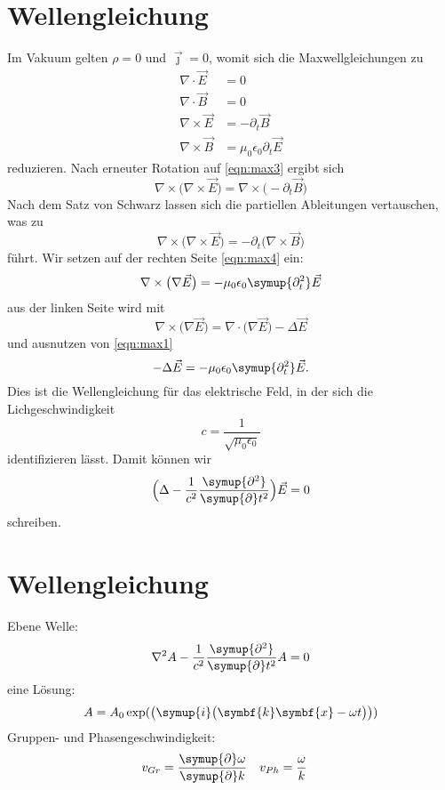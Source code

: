 \documentclass{scrartcl}
\newcommand{\be}{\begin{equation}} %
\newcommand{\ee}{\end{equation}} %
\begin{document}
\section{Wellengleichung}
Im Vakuum gelten $\rho=0$ und $\vec{\jmath}=0$,
womit sich die Maxwellgleichungen
zu
\begin{align}
  \nabla\cdot\vec{E}&=0 \label{eqn:max1} \\
  \nabla\cdot\vec{B}&=0 \label{eqn:max2} \\
  \nabla\times\vec{E}&=-\partial_t\vec{B} \label{eqn:max3} \\
  \nabla\times\vec{B}&=\mu_0\epsilon_0\partial_t\vec{E} \label{eqn:max4}
\end{align}
reduzieren. Nach erneuter Rotation auf \eqref{eqn:max3} ergibt sich
\be
\nabla\times\bigl(\nabla\times\vec{E}\bigr)=\nabla\times\bigl(-\partial_t\vec{B}\bigr)
\label{eqn:rot}
\ee
Nach dem Satz von Schwarz lassen sich die partiellen Ableitungen vertauschen, was zu
\be
\nabla\times\bigl(\nabla\times\vec{E}\bigr)=-\partial_t\bigl(\nabla\times\vec{B}\bigr)
\label{eqn:schwarz}
\ee
führt. Wir setzen auf der rechten Seite \eqref{eqn:max4} ein:
\be
\nabla\times\bigl(\nabla\vec{E}\bigr)=-\mu_0\epsilon_0\symup{\partial_t^2}\vec{E}\label{eqn:ein}
\ee
aus der linken Seite wird mit
\be
\nabla\times\bigl(\nabla\vec{E}\bigr)=\nabla\cdot\bigl(\nabla\vec{E}\bigr)-\Delta
\vec{E} \label{eqn:2}
\ee
\newpage
und ausnutzen von \eqref{eqn:max1}
\be
-\Delta\vec{E}=-\mu_0\epsilon_0\symup{\partial_t^2}\vec{E}.
\label{eqn:13}
\ee
Dies ist die Wellengleichung für das elektrische Feld,
in der sich die Lichgeschwindigkeit
\be
c=\frac{1}{\sqrt{\mu_0\epsilon_0}}\label{eqn:14}
\ee
identifizieren lässt. Damit können wir
\be
\Bigl(\Delta-\frac{1}{c^2}\frac{\symup{\partial^2}}{\symup{\partial}t^2}\Bigr)
\vec{E}=0 \label{eqn:15}
\ee
schreiben.
\section{Wellengleichung}
Ebene Welle:
\be
\nabla^2 A -\frac{1}{c^2}\frac{\symup{\partial^2}}{\symup{\partial}t^2}A=0
\label{eqn:16}
\ee
eine Lösung:
\be
A=A_0\exp(\bigl(\symup{i}\bigl(\symbf{k} \symbf{x}-\omega t\bigr)\bigr)) \label{eqn:17}
\ee
Gruppen- und Phasengeschwindigkeit:
\begin{align}
  v_{Gr}&=\frac{\symup{\partial}\omega}{\symup{\partial}k} &
  v_{Ph}&=\frac{\omega}{k}
\end{align}
\end{document}
